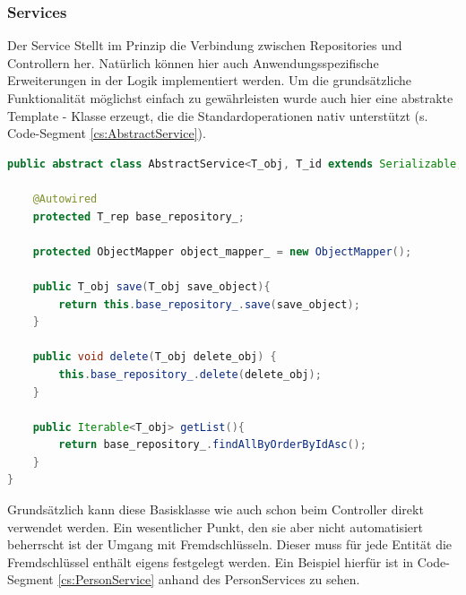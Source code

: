 \subsubsection{Services}
Der Service Stellt im Prinzip die Verbindung zwischen Repositories und Controllern her. Natürlich können hier auch Anwendungsspezifische Erweiterungen in der Logik implementiert werden. Um die grundsätzliche Funktionalität möglichst einfach zu gewährleisten wurde auch hier eine abstrakte Template - Klasse erzeugt, die die Standardoperationen nativ unterstützt (s. Code-Segment \ref{cs:AbstractService}).

\scriptsize
\begin{lstlisting}[caption=AbstractService.java, label=cs:AbstractService, language=Java]
public abstract class AbstractService<T_obj, T_id extends Serializable, T_rep extends AbstractRepository<T_obj, T_id>> implements AbstractServiceInterface<T_obj>{

	@Autowired
	protected T_rep base_repository_;
	
	protected ObjectMapper object_mapper_ = new ObjectMapper();
	
	public T_obj save(T_obj save_object){
		return this.base_repository_.save(save_object);
	}
	
	public void delete(T_obj delete_obj) { 
		this.base_repository_.delete(delete_obj);
	}
	
	public Iterable<T_obj> getList(){
		return base_repository_.findAllByOrderByIdAsc();
	}
}
\end{lstlisting}
\normalsize

Grundsätzlich kann diese Basisklasse wie auch schon beim Controller direkt verwendet werden. Ein wesentlicher Punkt, den sie aber nicht automatisiert beherrscht ist der Umgang mit Fremdschlüsseln. Dieser muss für jede Entität die Fremdschlüssel enthält eigens festgelegt werden. Ein Beispiel hierfür ist in Code-Segment \ref{cs:PersonService} anhand des PersonServices zu sehen.

